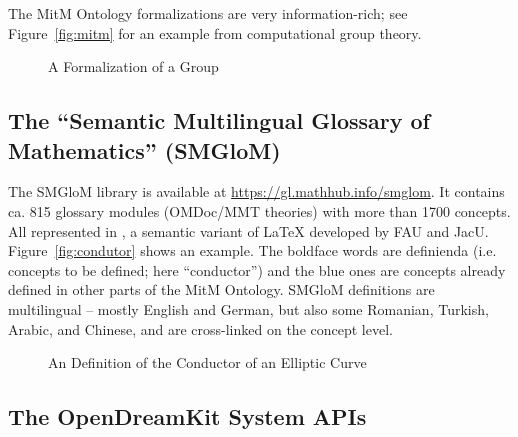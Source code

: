 \documentclass[book]{deliverablereport}
\begin{document}
The MitM Ontology formalizations are very information-rich; see Figure~\ref{fig:mitm} for
an example from computational group theory. 

\begin{figure}[ht]\centering
  \caption{A Formalization of a Group}\label{fig:mitm1}
\end{figure}

\subsection{The ``Semantic Multilingual Glossary of Mathematics'' (SMGloM)}\label{sec:smglom}
The SMGloM library is available at \url{https://gl.mathhub.info/smglom}. It contains
ca. 815 glossary modules (OMDoc/MMT theories) with more than 1700 concepts. All
represented in \sTeX, a semantic variant of {\LaTeX} developed by FAU and
JacU. Figure~\ref{fig:condutor} shows an example. The boldface words are definienda
(i.e. concepts to be defined; here ``conductor'') and the blue ones are concepts already
defined in other parts of the MitM Ontology. SMGloM definitions are multilingual -- mostly
English and German, but also some Romanian, Turkish, Arabic, and Chinese, and are
cross-linked on the concept level.

\begin{figure}[ht]\centering
  \caption{An \sTeX Definition of the Conductor of an Elliptic
    Curve}\label{fig:conductor}
\end{figure}

\subsection{The OpenDreamKit System APIs}
\end{document}
